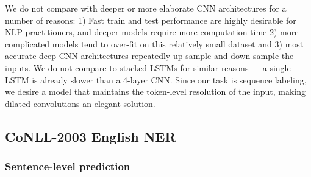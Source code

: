 We do not compare with deeper or more elaborate CNN architectures for a number of reasons: 1) Fast train and test performance are highly desirable for NLP practitioners, and deeper models require more computation time 2) more complicated models tend to over-fit on this relatively small dataset and 3) most accurate deep CNN architectures repeatedly up-sample and down-sample the inputs. We do not compare to stacked LSTMs for similar reasons --- a single LSTM is already slower than a 4-layer CNN. Since our task is sequence labeling, we desire a model that maintains the token-level resolution of the input, making dilated convolutions an elegant solution.

\subsection{CoNLL-2003 English NER}
\subsubsection{Sentence-level prediction}

